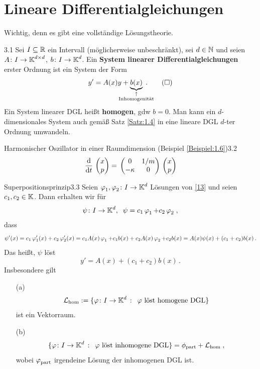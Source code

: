\documentclass[a4paper]{article}
\begin{document}
\section{Lineare Differentialgleichungen}
Wichtig, denn es gibt eine \glqq vollständige\grqq{} Lösungstheorie.

\begin{Def}{}{3.1}
Sei $I\subseteq \mathbb R$ ein Intervall (möglicherweise unbeschränkt), sei $d\in\operatorname{\mathbb N}$ und seien $A\colon I\to\operatorname{\mathbb K}^{d\times d}$, $b\colon I\to \operatorname{\mathbb K}^d$. Ein \textbf{System linearer Differentialgleichungen} erster Ordnung ist ein System der Form
\[
y'=A(x)y+\underbrace{b(x)}_{\mathclap{\substack{\uparrow\\\text{Inhomogenität}}}}\;.\tag{$\square$}\label{13}\]
Ein System linearer DGL heißt \textbf{homogen}, gdw $b=0$. Man kann ein $d$-dimensionales System auch gemäß Satz \ref{Satz:1.4} in eine lineare DGL $d$-ter Ordnung umwandeln.
\end{Def}

\begin{Beispiel}{Harmonischer Oszillator in einer Raumdimension (Beispiel \ref{Beispiel:1.6})}{3.2}
\[\frac{\mathop{}\!\mathrm{d}}{\mathop{}\!\mathrm{d} t}\mathop{}\begin{pmatrix}x\\p\end{pmatrix}=\mathop{}\begin{pmatrix}0&1/m\\-\kappa&0\end{pmatrix}\mathop{}\begin{pmatrix}x\\p\end{pmatrix}\]
\end{Beispiel}

\begin{Satz}{Superpositionsprinzip}{3.3}
Seien $\operatorname{\varphi}_1,\operatorname{\varphi}_2\colon I\to\operatorname{\mathbb K}^d$ Lösungen von \eqref{13} und seien $c_1,c_2\in\operatorname{\mathbb K}$. Dann erhalten wir für
\[\psi\colon I\to\operatorname{\mathbb K}^d,\;\;\psi=c_1\operatorname{\varphi}_1+c_2\operatorname{\varphi}_2\;,\]
dass
\[\psi'(x)=c_1\operatorname{\varphi}_1'(x)+c_2\operatorname{\varphi}_2'(x)=c_1A(x)\operatorname{\varphi}_1+c_1b(x)+c_2A(x)\operatorname{\varphi}_2+c_2b(x)=A(x)\psi(x)+(c_1+c_2)b(x)\,.\]
Das heißt, $\psi$ löst
\[y'=A(x)+(c_1+c_2)b(x)\,.\tag{$*$}\]
Insbesondere gilt
\begin{itemize}
    \item[(a)] \[\operatorname{\mathcal{L}}_{\text{hom}}:=\{\operatorname{\varphi}\colon I\to\operatorname{\mathbb K}^d\,:\,\text{ $\operatorname{\varphi}$ löst homogene DGL}\}\] 
    ist ein Vektorraum.
    \item[(b)] \[\{\operatorname{\varphi}\colon I\to\operatorname{\mathbb K}^d\,:\,\text{ $\operatorname{\varphi}$ löst inhomogene DGL}\}=\phi_{\text{part}}+\operatorname{\mathcal{L}}_{\text{hom}}\;,\]
    wobei $\operatorname{\varphi}_{\text{part}}$ irgendeine Lösung der inhomogenen DGL ist.
\end{itemize}
\end{Satz}
\end{document}
